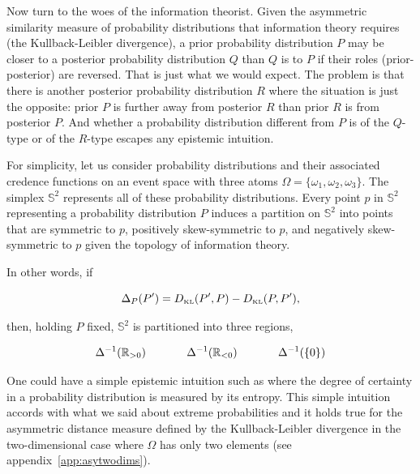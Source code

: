 \documentclass[phd,12pt,oneside]{ubcthesis}
\begin{document}
Now turn to the woes of the information theorist. Given the asymmetric
similarity measure of probability distributions that information
theory requires (the Kullback-Leibler divergence), a prior probability
distribution $P$ may be closer to a posterior probability distribution
$Q$ than $Q$ is to $P$ if their roles (prior-posterior) are reversed.
That is just what we would expect. The problem is that there is
another posterior probability distribution $R$ where the situation is
just the opposite: prior $P$ is further away from posterior $R$ than
prior $R$ is from posterior $P$. And whether a probability
distribution different from $P$ is of the $Q$-type or of the $R$-type
escapes any epistemic intuition.

For simplicity, let us consider probability distributions and their
associated credence functions on an event space with three atoms
$\Omega=\{\omega_{1},\omega_{2},\omega_{3}\}$. The simplex
$\mathbb{S}^{2}$ represents all of these probability distributions.
Every point $p$ in $\mathbb{S}^{2}$ representing a probability
distribution $P$ induces a partition on $\mathbb{S}^{2}$ into points
that are symmetric to $p$, positively skew-symmetric to $p$, and
negatively skew-symmetric to $p$ given the topology of information
theory.

In other words, if

\begin{equation}
  \label{eq:sksy}
  \Delta_{P}(P')=D_{\mbox{\tiny KL}}(P',P)-D_{\mbox{\tiny KL}}(P,P'),
\end{equation}

{\noindent}then, holding $P$ fixed, $\mathbb{S}^{2}$ is partitioned into three
regions, 

\begin{equation}
  \label{eq:sieruxis}
  \Delta^{-1}(\mathbb{R}_{>0})\hspace{.5in}\Delta^{-1}(\mathbb{R}_{<0})\hspace{.5in}\Delta^{-1}(\{0\})
\end{equation}

One could have a simple epistemic intuition such as 
where the degree of certainty in a probability distribution is
measured by its entropy. This simple intuition accords with what we
said about extreme probabilities and it holds true for the asymmetric
distance measure defined by the Kullback-Leibler divergence in the
two-dimensional case where $\Omega$ has only two elements (see
appendix~\ref{app:asytwodims}).
\end{document}
